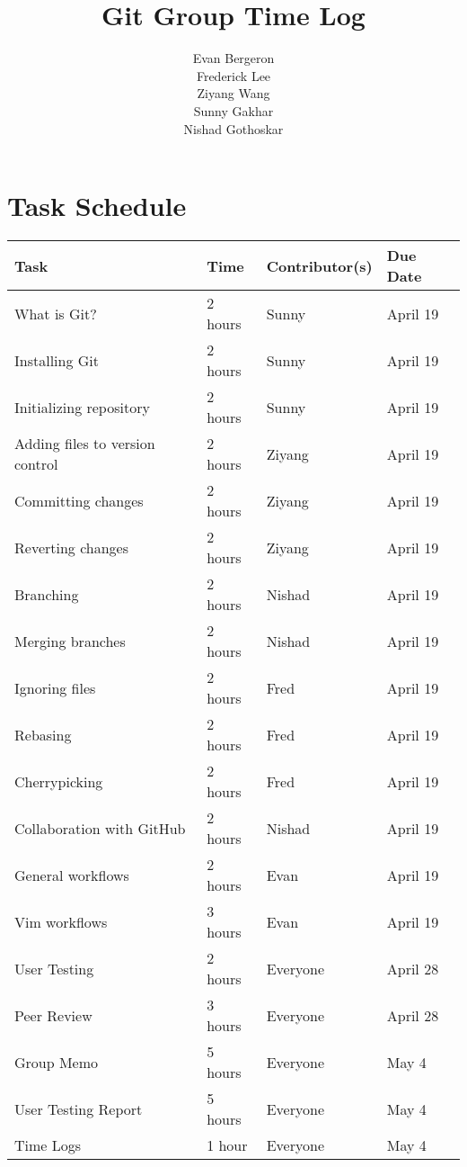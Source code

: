 \documentclass[11pt]{article}
\title{Git Group Time Log}
\author{Evan Bergeron\\
Frederick Lee\\
Ziyang Wang\\
Sunny Gakhar\\
Nishad Gothoskar}
\begin{document}
\maketitle

\section*{\center Task Schedule}
\begin{center}
\begin{tabular}{llll}
Task & Time & Contributor(s) & Due Date\\
\hline
What is Git? & 2 hours & Sunny & April 19\\
Installing Git & 2 hours & Sunny & April 19\\
Initializing repository & 2 hours & Sunny & April 19\\
Adding files to version control & 2 hours & Ziyang & April 19\\
Committing changes & 2 hours & Ziyang & April 19\\
Reverting changes & 2 hours & Ziyang & April 19\\
Branching & 2 hours & Nishad & April 19\\
Merging branches & 2 hours & Nishad & April 19\\
Ignoring files & 2 hours & Fred & April 19\\
Rebasing & 2 hours & Fred & April 19\\
Cherrypicking & 2 hours & Fred & April 19\\
Collaboration with GitHub & 2 hours & Nishad & April 19\\
General workflows & 2 hours & Evan & April 19\\
Vim workflows & 3 hours & Evan & April 19\\
User Testing & 2 hours & Everyone & April 28\\
Peer Review & 3 hours & Everyone & April 28\\
Group Memo & 5 hours & Everyone & May 4\\
User Testing Report & 5 hours & Everyone & May 4\\
Time Logs & 1 hour & Everyone & May 4
\end{tabular}
\end{center}
\end{document}
